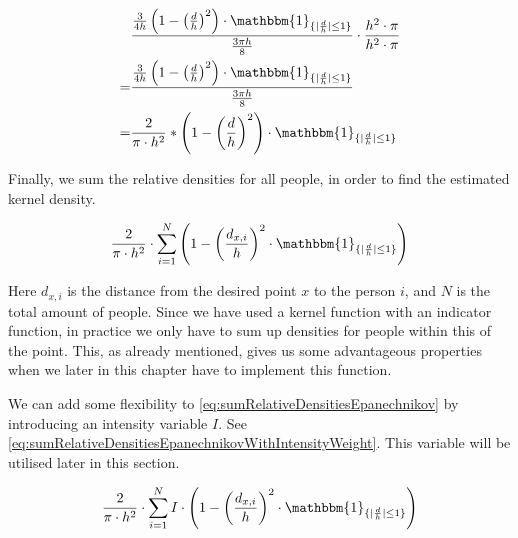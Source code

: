 \begin{equation}
\label{eq:relativeDensitiesEpanechnikov}
\begin{split}
&\frac{\frac{3}{4 h} \left(1 - \left(\frac{d}{h}\right)^2\right) \cdot \mathbbm{1}_{\{|\frac{d}{h}| \leq 1\}}}{\frac{3 \pi h}{8}} \cdot \frac{h^2 \cdot \pi}{h^2 \cdot \pi}\\
= &\frac{\frac{3}{4 h} \left(1 - \left(\frac{d}{h}\right)^2\right) \cdot  \mathbbm{1}_{\{|\frac{d}{h}| \leq 1\}}}{\frac{3 \pi h}{8}}\\
= &\frac{2}{\pi \cdot h^2} * \left(1-\left(\frac{d}{h}\right)^2\right) \cdot \mathbbm{1}_{\{|\frac{d}{h}| \leq 1\}}
\end{split}
\end{equation}

Finally, we sum the relative densities for all people, in order to find the estimated kernel density.

\begin{equation}
\label{eq:sumRelativeDensitiesEpanechnikov}
\frac{2}{\pi \cdot h^2} \cdot \sum_{i=1}^N \left(1-\left(\frac{d_{x,i}}{h}\right)^2 \cdot \mathbbm{1}_{\{|\frac{d}{h}| \leq 1\} }\right)
\end{equation}

Here $d_{x,i}$ is the distance from the desired point $x$ to the person $i$, and $N$ is the total amount of people. Since we have used a kernel function with an indicator function, in practice we only have to sum up densities for people within this of the point. This, as already mentioned, gives us some advantageous properties when we later in this chapter have to implement this function.

We can add some flexibility to \cref{eq:sumRelativeDensitiesEpanechnikov} by introducing an intensity variable $I$. See \cref{eq:sumRelativeDensitiesEpanechnikovWithIntensityWeight}. This variable will be utilised later in this section.

\begin{equation}
\label{eq:sumRelativeDensitiesEpanechnikovWithIntensityWeight}
\frac{2}{\pi \cdot h^2} \cdot \sum_{i=1}^N I \cdot \left(1-\left(\frac{d_{x,i}}{h}\right)^2 \cdot \mathbbm{1}_{\{|\frac{d}{h}| \leq 1\} }\right)
\end{equation}






